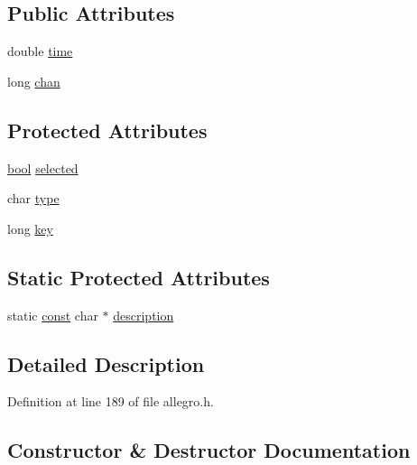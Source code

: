 \subsection*{Public Attributes}
\begin{DoxyCompactItemize}
\item 
double \hyperlink{class_alg__event_a7d31289f03b355f25e0ddd4657783a13}{time}
\item 
long \hyperlink{class_alg__event_aad79cff0b92503c9ad4f6fc7a6425d74}{chan}
\end{DoxyCompactItemize}
\subsection*{Protected Attributes}
\begin{DoxyCompactItemize}
\item 
\hyperlink{mac_2config_2i386_2lib-src_2libsoxr_2soxr-config_8h_abb452686968e48b67397da5f97445f5b}{bool} \hyperlink{class_alg__event_aa2f99bc020910867ebd30115c30c15e0}{selected}
\item 
char \hyperlink{class_alg__event_a4643acd437fcf4232ee7eda633fa6ed5}{type}
\item 
long \hyperlink{class_alg__event_a8cba29daebc877d00fff5948aeda73f0}{key}
\end{DoxyCompactItemize}
\subsection*{Static Protected Attributes}
\begin{DoxyCompactItemize}
\item 
static \hyperlink{getopt1_8c_a2c212835823e3c54a8ab6d95c652660e}{const} char $\ast$ \hyperlink{class_alg__event_abdeb5a93114d6f08dbeee05620d74c14}{description}
\end{DoxyCompactItemize}


\subsection{Detailed Description}


Definition at line 189 of file allegro.\+h.



\subsection{Constructor \& Destructor Documentation}

